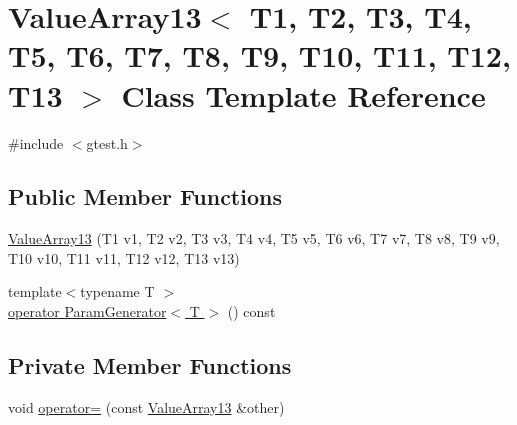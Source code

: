 \hypertarget{classtesting_1_1internal_1_1ValueArray13}{\section{\-Value\-Array13$<$ \-T1, \-T2, \-T3, \-T4, \-T5, \-T6, \-T7, \-T8, \-T9, \-T10, \-T11, \-T12, \-T13 $>$ \-Class \-Template \-Reference}
\label{d7/d86/classtesting_1_1internal_1_1ValueArray13}
}


{\ttfamily \#include $<$gtest.\-h$>$}

\subsection*{\-Public \-Member \-Functions}
\begin{DoxyCompactItemize}
\item 
\hyperlink{classtesting_1_1internal_1_1ValueArray13_a99249ca3d6d4db3e873351d010aa9e37}{\-Value\-Array13} (\-T1 v1, \-T2 v2, \-T3 v3, \-T4 v4, \-T5 v5, \-T6 v6, \-T7 v7, \-T8 v8, \-T9 v9, \-T10 v10, \-T11 v11, \-T12 v12, \-T13 v13)
\item 
{\footnotesize template$<$typename T $>$ }\\\hyperlink{classtesting_1_1internal_1_1ValueArray13_a08ef46fa12c9dd8ef6fc630baeea89b7}{operator Param\-Generator$<$ T $>$} () const 
\end{DoxyCompactItemize}
\subsection*{\-Private \-Member \-Functions}
\begin{DoxyCompactItemize}
\item 
void \hyperlink{classtesting_1_1internal_1_1ValueArray13_abc71983fca21a94616752abc95aed50c}{operator=} (const \hyperlink{classtesting_1_1internal_1_1ValueArray13}{\-Value\-Array13} \&other)
\end{DoxyCompactItemize}
